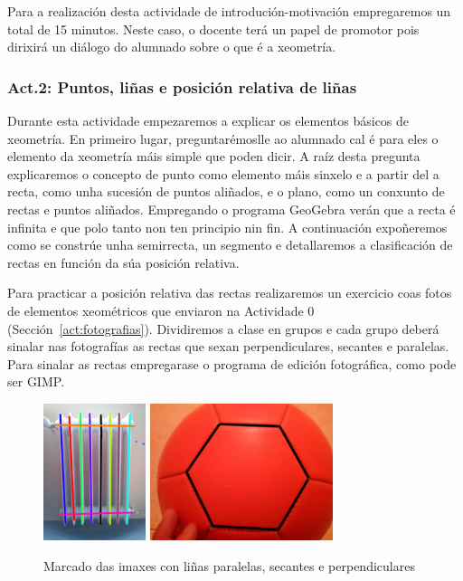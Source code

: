 Para a realización desta actividade de introdución-motivación empregaremos un total de 15 minutos. Neste caso, o docente terá un papel de promotor pois dirixirá un diálogo do alumnado sobre o que é a xeometría.

\subsubsection{Act.2: Puntos, liñas e posición relativa de liñas}\label{act:rectas}
Durante esta actividade empezaremos a explicar os elementos básicos de xeometría. En primeiro lugar, preguntarémoslle ao alumnado cal é para eles o elemento da xeometría máis simple que poden dicir. A raíz desta pregunta explicaremos o concepto de punto como elemento máis sinxelo e a partir del a recta, como unha sucesión de puntos aliñados, e o plano, como un conxunto de rectas e puntos aliñados. Empregando o programa GeoGebra verán que a recta é infinita e que polo tanto non ten principio nin fin. A continuación expoñeremos como se constrúe unha semirrecta, un segmento e detallaremos a clasificación de rectas en función da súa posición relativa.

Para practicar a posición relativa das rectas realizaremos un exercicio coas fotos de elementos xeométricos que enviaron na Actividade 0 (Sección~\ref{act:fotografias}). Dividiremos a clase en grupos e cada grupo deberá sinalar nas fotografías as rectas que sexan perpendiculares, secantes e paralelas. Para sinalar as rectas empregarase o programa de edición fotográfica, como pode ser GIMP.

\begin{figure}[h!]
  \centering
  \includegraphics[height=4cm]{img/act1-img.jpg}
  \includegraphics[height=4cm]{img/act1-img2.jpg}
  \caption{Marcado das imaxes con liñas paralelas, secantes e perpendiculares}\label{fig:act2}
\end{figure}

